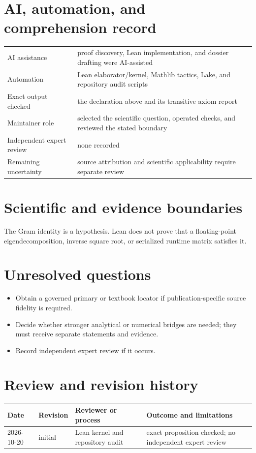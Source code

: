 \documentclass[11pt]{article}
\begin{document}
\section{AI, automation, and comprehension record}
\begin{tabularx}{\textwidth}{@{}lY@{}}\toprule
AI assistance & proof discovery, Lean implementation, and dossier drafting were AI-assisted \\
Automation & Lean elaborator/kernel, Mathlib tactics, Lake, and repository audit scripts \\
Exact output checked & the declaration above and its transitive axiom report \\
Maintainer role & selected the scientific question, operated checks, and reviewed the stated boundary \\
Independent expert review & none recorded \\
Remaining uncertainty & source attribution and scientific applicability require separate review \\
\bottomrule\end{tabularx}

\section{Scientific and evidence boundaries}
The Gram identity is a hypothesis. Lean does not prove that a floating-point eigendecomposition, inverse square root, or serialized runtime matrix satisfies it.

\section{Unresolved questions}
\begin{itemize}
\item Obtain a governed primary or textbook locator if publication-specific source fidelity is required.
\item Decide whether stronger analytical or numerical bridges are needed; they must receive separate statements and evidence.
\item Record independent expert review if it occurs.
\end{itemize}

\section{Review and revision history}
\begin{tabularx}{\textwidth}{@{}lllX@{}}\toprule
Date & Revision & Reviewer or process & Outcome and limitations \\
\midrule
2026-10-20 & initial & Lean kernel and repository audit & exact proposition checked; no independent expert review \\
\bottomrule\end{tabularx}
\end{document}
